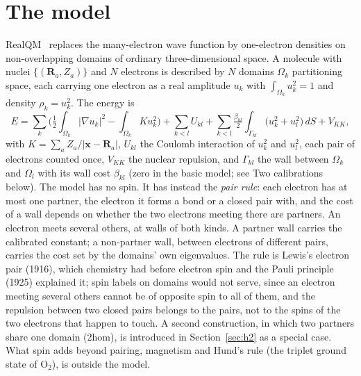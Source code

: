 \documentclass[11pt]{article}
\begin{document}
\section{The model}
\label{sec:model}

RealQM~\cite{realqm} replaces the many-electron wave function by one-electron densities on
non-overlapping domains of ordinary three-dimensional space. A molecule with nuclei
$\{(\mathbf{R}_a, Z_a)\}$ and $N$ electrons is described by $N$ domains $\Omega_k$ partitioning
space, each carrying one electron as a real amplitude $u_k$ with $\int_{\Omega_k} u_k^2 = 1$ and density
$\rho_k = u_k^2$. The energy is
\begin{equation}
E = \sum_k \Big( \tfrac12 \int_{\Omega_k} |\nabla u_k|^2 - \int_{\Omega_k} K u_k^2 \Big)
  + \sum_{k<l} U_{kl} + \sum_{k<l} \tfrac{\beta_{kl}}{2} \int_{\Gamma_{kl}} \big(u_k^2 + u_l^2\big)\,dS + V_{KK},
\label{eq:E}
\end{equation}
with $K = \sum_a Z_a/|\mathbf{x} - \mathbf{R}_a|$, $U_{kl}$ the Coulomb interaction of $u_k^2$ and $u_l^2$, each
pair of electrons counted once, $V_{KK}$ the nuclear repulsion, and $\Gamma_{kl}$ the wall between $\Omega_k$ and
$\Omega_l$ with its wall cost $\beta_{kl}$ (zero in the basic model; see Two calibrations below). The model has no
spin. It has instead the \emph{pair rule}: each electron has at most one partner, the electron it forms a bond or a
closed pair with, and the cost of a wall depends on whether the two electrons meeting there are partners.
An electron meets several others, at walls of both kinds. A partner wall carries the calibrated constant; a
non-partner wall, between electrons of different pairs, carries the cost set by the domains' own eigenvalues.
The rule is Lewis's electron pair (1916), which chemistry had before electron spin and the Pauli principle
(1925) explained it; spin labels on domains would not serve, since an electron meeting several others cannot
be of opposite spin to all of them, and the repulsion between two closed pairs belongs to the pairs, not to the
spins of the two electrons that happen to touch. A second construction, in which two partners share one domain
(2hom), is introduced in Section~\ref{sec:h2} as a special case. What spin adds beyond pairing, magnetism and
Hund's rule (the triplet ground state of O$_2$), is outside the model.
\end{document}
